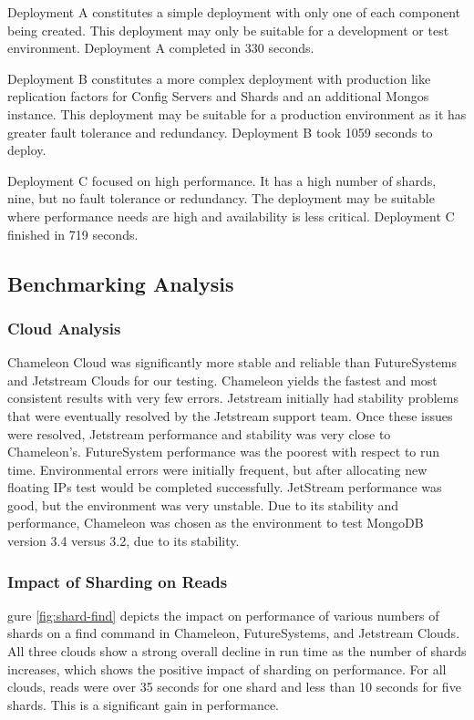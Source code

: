\documentclass[sigconf]{acmart}
\begin{document}
Deployment A constitutes a simple deployment with only one of each component
being created.  This deployment may only be suitable for a development
or test environment.  Deployment A completed in 330 seconds.

Deployment B constitutes a more complex deployment with production like
replication factors for Config Servers and Shards and an additional
Mongos instance.  This deployment may be suitable for a production
environment as it has greater fault tolerance and redundancy.
Deployment B took 1059 seconds to deploy.

Deployment C focused on high performance.  It has a high number of
shards, nine, but no fault tolerance or redundancy.  The deployment
may be suitable where performance needs are high and availability is
less critical.  Deployment C finished in 719 seconds.



\subsection{Benchmarking Analysis}


\subsubsection{Cloud Analysis}

Chameleon Cloud was significantly more stable and reliable than
FutureSystems and Jetstream Clouds for our testing.  Chameleon yields
the fastest and most consistent results with very few errors.
Jetstream initially had stability problems that were eventually
resolved by the Jetstream support team.  Once these issues were
resolved, Jetstream performance and stability was very close to
Chameleon's.  FutureSystem performance was the poorest with respect to
run time.  Environmental errors were initially frequent, but after
allocating new floating IPs test would be completed successfully.
JetStream performance was good, but the environment was very unstable.
Due to its stability and performance, Chameleon was chosen as the
environment to test MongoDB version 3.4 versus 3.2, due to its
stability.

\subsubsection{Impact of Sharding on Reads}


gure \ref{fig:shard-find} depicts the impact on performance of various
numbers of shards on a find command in Chameleon, FutureSystems, and
Jetstream Clouds.  All three clouds show a strong overall decline in
run time as the number of shards increases, which shows the positive
impact of sharding on performance.  For all clouds, reads were over 35
seconds for one shard and less than 10 seconds for five shards.  This
is a significant gain in performance.
\end{document}
